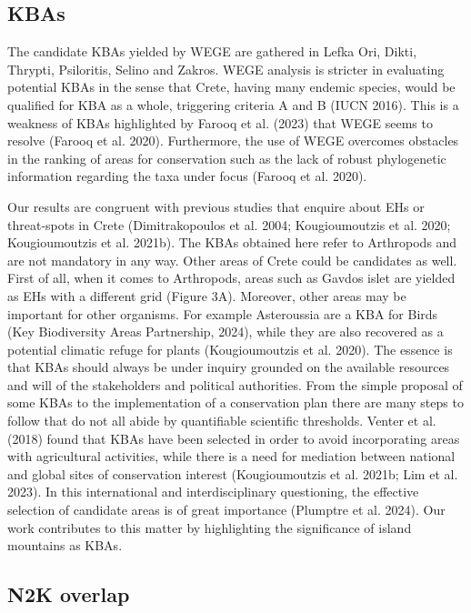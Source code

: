     \subsection{KBAs}
    \label{subsec:arthropods-KBAs}
    
The candidate KBAs yielded by WEGE are gathered in Lefka Ori, Dikti, Thrypti,
Psiloritis, Selino and Zakros. WEGE analysis is stricter in evaluating
potential KBAs in the sense that Crete, having many endemic species, would be
qualified for KBA as a whole, triggering criteria A and B (IUCN 2016).
This is a weakness of KBAs highlighted by Farooq et al. (2023) that WEGE seems
to resolve (Farooq et al. 2020). Furthermore, the use of WEGE overcomes
obstacles in the ranking of areas for conservation such as the lack of robust
phylogenetic information regarding the taxa under focus (Farooq et al. 2020).

Our results are congruent with previous studies that enquire about EHs or
threat-spots in Crete (Dimitrakopoulos et al. 2004; Kougioumoutzis et al. 2020; Kougioumoutzis et al. 2021b).
The KBAs obtained here refer to Arthropods and are not mandatory in any way.
Other areas of Crete could be candidates as well. First of all, when it comes to
Arthropods, areas such as Gavdos islet are yielded as EHs with a different grid (Figure 3A).
Moreover, other areas may be important for other organisms. For example Asteroussia
are a KBA for Birds (Key Biodiversity Areas Partnership, 2024), while they are
also recovered as a potential climatic refuge for plants (Kougioumoutzis et al. 2020).
The essence is that KBAs should always be under inquiry grounded on the available
resources and will of the stakeholders and political authorities. From the
simple proposal of some KBAs to the implementation of a conservation plan there
are many steps to follow that do not all abide by quantifiable scientific
thresholds. Venter et al. (2018) found that KBAs have been selected in order to
avoid incorporating areas with agricultural activities, while there is a need
for mediation between national and global sites of conservation
interest (Kougioumoutzis et al. 2021b; Lim et al. 2023). In this international
and interdisciplinary questioning, the effective selection of candidate areas
is of great importance (Plumptre et al. 2024). Our work contributes to this
matter by highlighting the significance of island mountains as KBAs.

    \subsection{N2K overlap}
    \label{subsec:arthropods-N2K-overlap}

